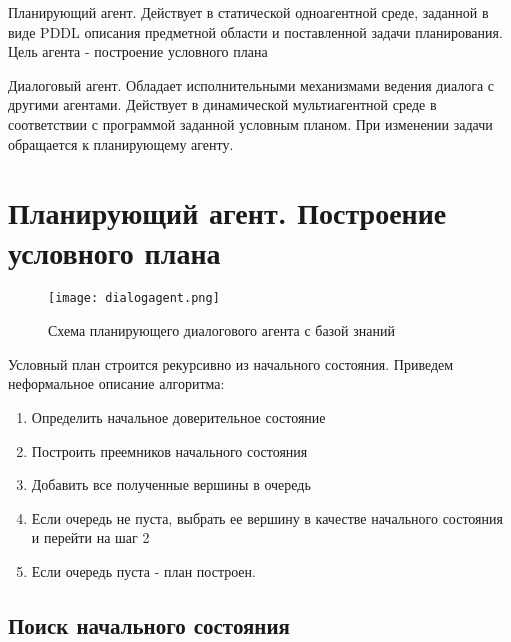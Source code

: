 \begin{itemize*}
\item
  Планирующий агент. Действует в статической одноагентной среде,
  заданной в виде PDDL описания предметной области и поставленной задачи
  планирования. Цель агента - построение условного плана
\item
  Диалоговый агент. Обладает исполнительными механизмами ведения диалога
  с другими агентами. Действует в динамической мультиагентной среде в
  соответствии с программой заданной условным планом. При изменении
  задачи обращается к планирующему агенту.
\end{itemize*}

\section{Планирующий агент. Построение условного плана}

\begin{figure}[h]
 \centering
 \texttt{[image: dialogagent.png]}
 \caption{Схема планирующего диалогового агента с базой знаний}
\end{figure}

Условный план строится рекурсивно из начального состояния. Приведем неформальное описание алгоритма:

\begin{enumerate}
\item
  Определить начальное доверительное состояние
\item
  Построить преемников начального состояния

\item
  Добавить все полученные вершины в очередь
\item
  Если очередь не пуста, выбрать ее вершину в качестве начального
  состояния и перейти на шаг 2
\item
  Если очередь пуста - план построен.
\end{enumerate}

\subsection{Поиск начального состояния}

